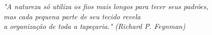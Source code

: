 
\begin{epigrafe}
	\vspace*{\fill}
		\begin{flushright}
			\textit{"A natureza só utiliza os fios mais longos para tecer seus padrões, \\
			        mas cada pequena parte de seu tecido revela \\
					a organização de toda a tapeçaria." (Richard P. Feynman)}
		\end{flushright}
\end{epigrafe}